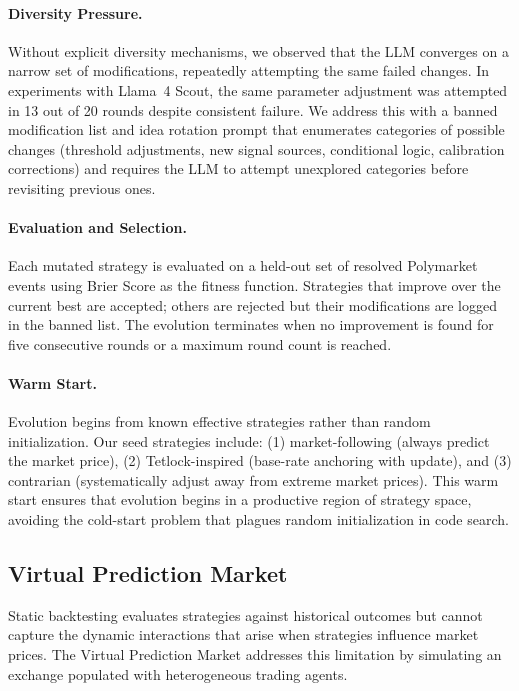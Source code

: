 \paragraph{Diversity Pressure.} Without explicit diversity mechanisms, we observed that the LLM converges on a narrow set of modifications, repeatedly attempting the same failed changes. In experiments with Llama~4 Scout, the same parameter adjustment was attempted in 13 out of 20 rounds despite consistent failure. We address this with a banned modification list and idea rotation prompt that enumerates categories of possible changes (threshold adjustments, new signal sources, conditional logic, calibration corrections) and requires the LLM to attempt unexplored categories before revisiting previous ones.

\paragraph{Evaluation and Selection.} Each mutated strategy is evaluated on a held-out set of resolved Polymarket events using Brier Score as the fitness function. Strategies that improve over the current best are accepted; others are rejected but their modifications are logged in the banned list. The evolution terminates when no improvement is found for five consecutive rounds or a maximum round count is reached.

\paragraph{Warm Start.} Evolution begins from known effective strategies rather than random initialization. Our seed strategies include: (1) market-following (always predict the market price), (2) Tetlock-inspired (base-rate anchoring with update), and (3) contrarian (systematically adjust away from extreme market prices). This warm start ensures that evolution begins in a productive region of strategy space, avoiding the cold-start problem that plagues random initialization in code search.

\subsection{Virtual Prediction Market}
\label{sec:virtual_market}

Static backtesting evaluates strategies against historical outcomes but cannot capture the dynamic interactions that arise when strategies influence market prices. The Virtual Prediction Market addresses this limitation by simulating an exchange populated with heterogeneous trading agents.

